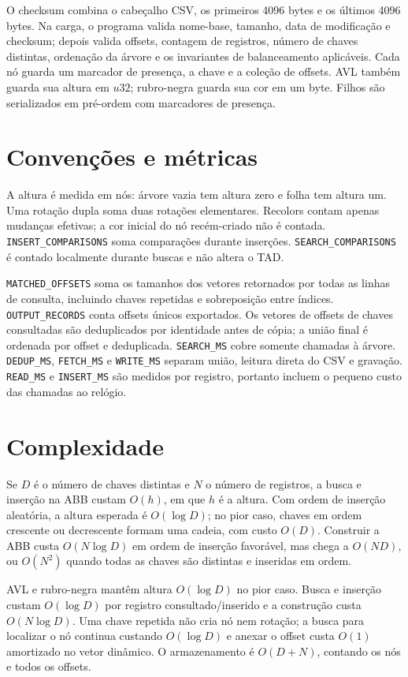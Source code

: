\documentclass[12pt,a4paper]{article}
\begin{document}
O checksum combina o cabeçalho CSV, os primeiros 4096 bytes e os últimos 4096 bytes. Na carga, o programa valida nome-base, tamanho, data de modificação e checksum; depois valida offsets, contagem de registros, número de chaves distintas, ordenação da árvore e os invariantes de balanceamento aplicáveis. Cada nó guarda um marcador de presença, a chave e a coleção de offsets. AVL também guarda sua altura em $u32$; rubro-negra guarda sua cor em um byte. Filhos são serializados em pré-ordem com marcadores de presença.

\section{Convenções e métricas}
A altura é medida em nós: árvore vazia tem altura zero e folha tem altura um. Uma rotação dupla soma duas rotações elementares. Recolors contam apenas mudanças efetivas; a cor inicial do nó recém-criado não é contada. \texttt{INSERT\_COMPARISONS} soma comparações durante inserções. \texttt{SEARCH\_COMPARISONS} é contado localmente durante buscas e não altera o TAD.

\texttt{MATCHED\_OFFSETS} soma os tamanhos dos vetores retornados por todas as linhas de consulta, incluindo chaves repetidas e sobreposição entre índices. \texttt{OUTPUT\_RECORDS} conta offsets únicos exportados. Os vetores de offsets de chaves consultadas são deduplicados por identidade antes de cópia; a união final é ordenada por offset e deduplicada. \texttt{SEARCH\_MS} cobre somente chamadas à árvore. \texttt{DEDUP\_MS}, \texttt{FETCH\_MS} e \texttt{WRITE\_MS} separam união, leitura direta do CSV e gravação. \texttt{READ\_MS} e \texttt{INSERT\_MS} são medidos por registro, portanto incluem o pequeno custo das chamadas ao relógio.

\section{Complexidade}
Se $D$ é o número de chaves distintas e $N$ o número de registros, a busca e inserção na ABB custam $O(h)$, em que $h$ é a altura. Com ordem de inserção aleatória, a altura esperada é $O(\log D)$; no pior caso, chaves em ordem crescente ou decrescente formam uma cadeia, com custo $O(D)$. Construir a ABB custa $O(N\log D)$ em ordem de inserção favorável, mas chega a $O(ND)$, ou $O(N^2)$ quando todas as chaves são distintas e inseridas em ordem.

AVL e rubro-negra mantêm altura $O(\log D)$ no pior caso. Busca e inserção custam $O(\log D)$ por registro consultado/inserido e a construção custa $O(N\log D)$. Uma chave repetida não cria nó nem rotação; a busca para localizar o nó continua custando $O(\log D)$ e anexar o offset custa $O(1)$ amortizado no vetor dinâmico. O armazenamento é $O(D+N)$, contando os nós e todos os offsets.
\end{document}
